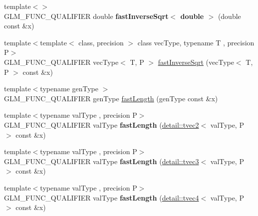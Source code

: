 \begin{DoxyCompactItemize}
\item 
{\footnotesize template$<$$>$ }\\G\+L\+M\+\_\+\+F\+U\+N\+C\+\_\+\+Q\+U\+A\+L\+I\+F\+I\+ER double {\bfseries fast\+Inverse\+Sqrt$<$ double $>$} (double const \&x)\hypertarget{namespaceglm_aac78c01dd432421901cd0ae70ad5cc7b}{}\label{namespaceglm_aac78c01dd432421901cd0ae70ad5cc7b}

\item 
{\footnotesize template$<$template$<$ class, precision $>$ class vec\+Type, typename T , precision P$>$ }\\G\+L\+M\+\_\+\+F\+U\+N\+C\+\_\+\+Q\+U\+A\+L\+I\+F\+I\+ER vec\+Type$<$ T, P $>$ \hyperlink{group__gtx__fast__square__root_ga903878071f92e51e551791e584a171a1}{fast\+Inverse\+Sqrt} (vec\+Type$<$ T, P $>$ const \&x)
\item 
{\footnotesize template$<$typename gen\+Type $>$ }\\G\+L\+M\+\_\+\+F\+U\+N\+C\+\_\+\+Q\+U\+A\+L\+I\+F\+I\+ER gen\+Type \hyperlink{group__gtx__fast__square__root_ga70aa3c80d8bb22e021c6c3ebdcf8e3ee}{fast\+Length} (gen\+Type const \&x)
\item 
{\footnotesize template$<$typename val\+Type , precision P$>$ }\\G\+L\+M\+\_\+\+F\+U\+N\+C\+\_\+\+Q\+U\+A\+L\+I\+F\+I\+ER val\+Type {\bfseries fast\+Length} (\hyperlink{structglm_1_1detail_1_1tvec2}{detail\+::tvec2}$<$ val\+Type, P $>$ const \&x)\hypertarget{namespaceglm_a37a797293ad5fb1be42bac6e9bc93954}{}\label{namespaceglm_a37a797293ad5fb1be42bac6e9bc93954}

\item 
{\footnotesize template$<$typename val\+Type , precision P$>$ }\\G\+L\+M\+\_\+\+F\+U\+N\+C\+\_\+\+Q\+U\+A\+L\+I\+F\+I\+ER val\+Type {\bfseries fast\+Length} (\hyperlink{structglm_1_1detail_1_1tvec3}{detail\+::tvec3}$<$ val\+Type, P $>$ const \&x)\hypertarget{namespaceglm_aa0d5ca1b5137d3ac5fd2540e64bbd392}{}\label{namespaceglm_aa0d5ca1b5137d3ac5fd2540e64bbd392}

\item 
{\footnotesize template$<$typename val\+Type , precision P$>$ }\\G\+L\+M\+\_\+\+F\+U\+N\+C\+\_\+\+Q\+U\+A\+L\+I\+F\+I\+ER val\+Type {\bfseries fast\+Length} (\hyperlink{structglm_1_1detail_1_1tvec4}{detail\+::tvec4}$<$ val\+Type, P $>$ const \&x)\hypertarget{namespaceglm_af2f50a91884f2201588d4cef66dd7ff0}{}\label{namespaceglm_af2f50a91884f2201588d4cef66dd7ff0}


\end{DoxyCompactItemize}
